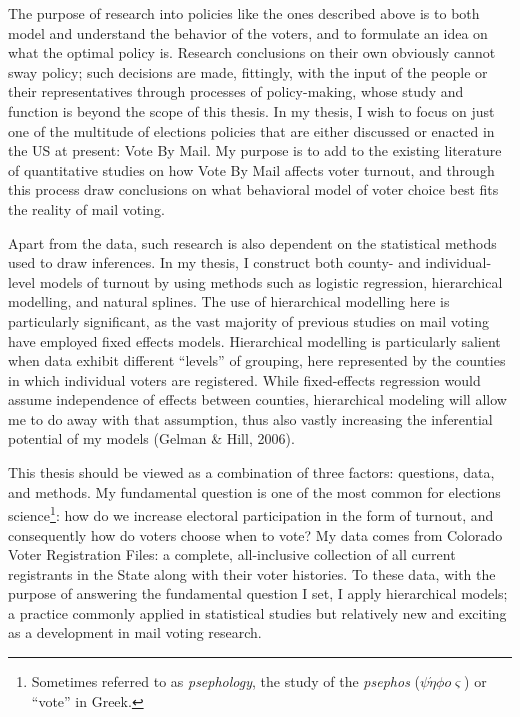 \documentclass[12pt,twoside]{reedthesis}
\begin{document}
  The purpose of research into policies like the ones described above is
  to both model and understand the behavior of the voters, and to
  formulate an idea on what the optimal policy is. Research conclusions on
  their own obviously cannot sway policy; such decisions are made,
  fittingly, with the input of the people or their representatives through
  processes of policy-making, whose study and function is beyond the scope
  of this thesis. In my thesis, I wish to focus on just one of the
  multitude of elections policies that are either discussed or enacted in
  the US at present: Vote By Mail. My purpose is to add to the existing
  literature of quantitative studies on how Vote By Mail affects voter
  turnout, and through this process draw conclusions on what behavioral
  model of voter choice best fits the reality of mail voting.
  
  Apart from the data, such research is also dependent on the statistical
  methods used to draw inferences. In my thesis, I construct both county-
  and individual-level models of turnout by using methods such as logistic
  regression, hierarchical modelling, and natural splines. The use of
  hierarchical modelling here is particularly significant, as the vast
  majority of previous studies on mail voting have employed fixed effects
  models. Hierarchical modelling is particularly salient when data exhibit
  different ``levels'' of grouping, here represented by the counties in
  which individual voters are registered. While fixed-effects regression
  would assume independence of effects between counties, hierarchical
  modeling will allow me to do away with that assumption, thus also vastly
  increasing the inferential potential of my models (Gelman \& Hill,
  2006).
  
  This thesis should be viewed as a combination of three factors:
  questions, data, and methods. My fundamental question is one of the most
  common for elections science\footnote{Sometimes referred to as
    \emph{psephology}, the study of the \emph{psephos}
    (\(\psi \acute \eta \phi o \varsigma\)) or ``vote'' in Greek.}: how do
  we increase electoral participation in the form of turnout, and
  consequently how do voters choose when to vote? My data comes from
  Colorado Voter Registration Files: a complete, all-inclusive collection
  of all current registrants in the State along with their voter
  histories. To these data, with the purpose of answering the fundamental
  question I set, I apply hierarchical models; a practice commonly applied
  in statistical studies but relatively new and exciting as a development
  in mail voting research.
  
\end{document}
